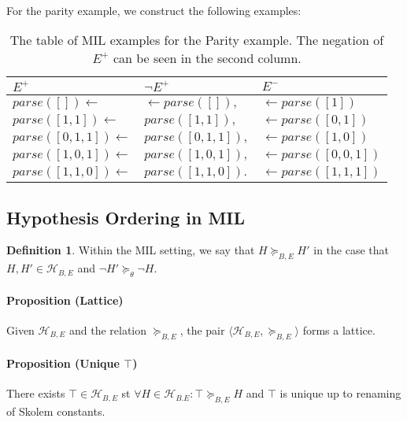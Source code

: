 \documentclass{article}
\theoremstyle{plain}
\theoremstyle{definition}
\newtheorem{defn}[thm]{Definition} %
\begin{document}
\begin{multicols}{2}
\paragraph{} For the parity example, we construct the following examples:

\begin{table}[H]
\centering\footnotesize
\begin{tabular}{ | l | l | l | }

\hline
$E^+$ & $\lnot E^+$ & $E^-$ \\
\hline

$parse([]) \leftarrow$ & $\leftarrow parse([]),$ & $\leftarrow parse([1])$ \\
$parse([1, 1]) \leftarrow$ & $parse([1, 1]),$ & $\leftarrow parse([0, 1])$ \\
$parse([0, 1, 1]) \leftarrow$ & $parse([0, 1, 1]),$ & $\leftarrow parse([1, 0])$ \\
$parse([1, 0, 1]) \leftarrow$ & $parse([1, 0, 1]),$ & $\leftarrow parse([0, 0, 1])$ \\
$parse([1, 1, 0]) \leftarrow$ & $parse([1, 1, 0]).$ & $\leftarrow parse([1, 1, 1])$ \\

\hline
\end{tabular}
\caption{The table of MIL examples for the Parity example. The negation of $E^+$ can be seen in the second column.}
\end{table}

\subsection{Hypothesis Ordering in MIL}

\begin{defn}Within the MIL setting, we say that $H \succeq_{B,E} H'$ in the case that $H, H' \in \mathcal{H}_{B,E}$ and $\lnot H' \succeq_\theta \lnot H$.\end{defn}

\paragraph{Proposition (Lattice)} Given $\mathcal{H}_{B,E}$ and the relation $\succeq_{B,E}$, the pair $\langle \mathcal{H}_{B,E}, \succeq_{B,E} \rangle$ forms a lattice.

\paragraph{Proposition (Unique $\top$)} There exists $\top \in \mathcal{H}_{B,E}$ st $\forall H \in \mathcal{H}_{B.E}: \top \succeq_{B,E} H$ and $\top$ is unique up to renaming of Skolem constants.


\end{multicols}
\end{document}
